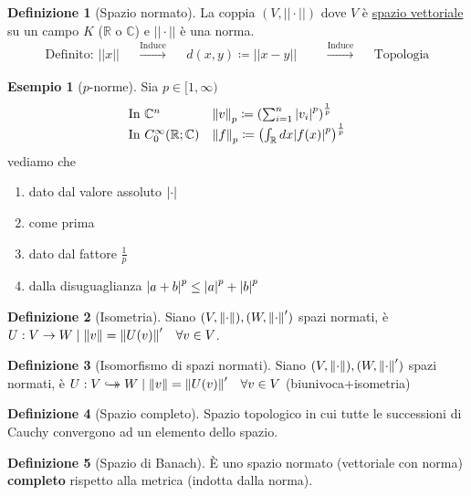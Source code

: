 \documentclass[a4paper,10pt]{article}
\theoremstyle{definition}
\newcommand{\re}{\mathbb{R}} %
\newcommand{\im}{\mathbb{C}} %
\newcommand{\hookdoubleheadrightarrow}{\hookrightarrow\mathrel{\mspace{-15mu}}\rightarrow}
\newcommand{\bij}{\hookdoubleheadrightarrow} %
\theoremstyle{indentdefinition}
\newtheorem{defn}{Definizione}[section]
\theoremstyle{indenttheorem}
\theoremstyle{myremark}
\newtheorem{example*}{Esempio}
\theoremstyle{indentgeneral}
\begin{document}
\begin{defn}[Spazio normato]
    La coppia $(V, ||\cdot||)$ dove $V$ è \underline{spazio vettoriale} su un campo $K$ ($\re$ o $\im$)  e $||\cdot||$ è una norma. 
    \begin{align*}
        \text{Definito: } ||x|| & & \overset{\text{Induce}}{\longrightarrow} & & d(x,y) \coloneqq ||x-y||  & & 
        &\overset{\text{Induce}}{\longrightarrow} & & \text{Topologia} 
\end{align*}
\end{defn}

\begin{example*}[$p$-norme] Sia $p\in[1,\infty)$
    $$\begin{array}{ll}
       \text{In }\im^n  &  \norm{v}_p\coloneqq\left(\sum_{i=1}^n\abs{v_i}^p\right)^{\frac{1}{p}}\\
       \text{In }C_0^\infty(\re;\im)  & \norm{f}_p\coloneqq\left(\int_\re dx\abs{f(x)}^p\right)^{\frac{1}{p}}
    \end{array}$$
    vediamo che
    \begin{enumerate}
        \item dato dal valore assoluto $\abs{\cdot}$
        \item come prima
        \item dato dal fattore $\frac{1}{p}$
        \item dalla disuguaglianza $\abs{a+b}^p\le \abs{a}^p+\abs{b}^p$
    \end{enumerate}
\end{example*}

\begin{defn}[Isometria]
    Siano $(V,\norm{\cdot}),(W,\norm{\cdot}')$ spazi normati, è $U:V\to W\mid \norm{v}=\norm{U(v)}'\quad\forall v\in V$.\\
\end{defn}

\begin{defn}[Isomorfismo di spazi normati] \label{defn-iso-spazi-normati}
    Siano $(V,\norm{\cdot}),(W,\norm{\cdot}')$ spazi normati, è $U:V\bij W\mid \norm{v}=\norm{U(v)}'\quad\forall v\in V$ (biunivoca+isometria)
\end{defn}

\begin{defn}[Spazio completo]
    Spazio topologico in cui tutte le successioni di Cauchy convergono ad un elemento dello spazio.
\end{defn}

\begin{defn}[Spazio di Banach]\label{defn-spazio-di-Banach}
    È uno spazio normato (vettoriale con norma) \textbf{completo} rispetto alla metrica (indotta dalla norma).
\end{defn}
\end{document}
